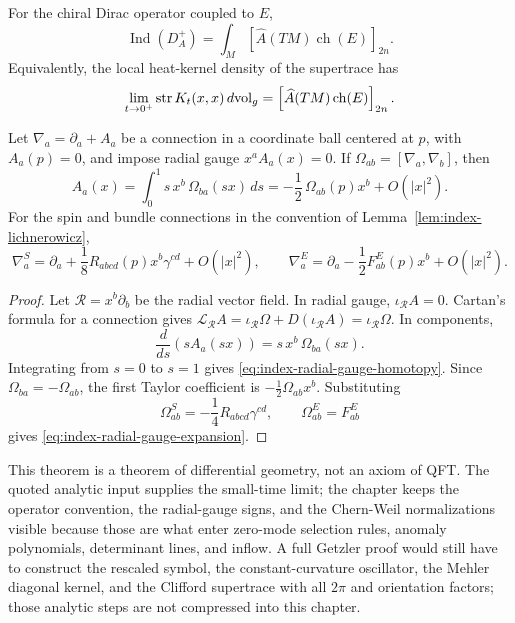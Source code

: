 \begin{quotedtheorem}
\label{thm:index-atiyah-singer-local}
For the chiral Dirac operator coupled to \(E\),
\begin{equation}
  \operatorname{Ind}(D_A^+)
  =
  \int_M
  \left[\widehat A(TM)\operatorname{ch}(E)\right]_{2n}.
  \label{eq:index-atiyah-singer}
\end{equation}
Equivalently, the local heat-kernel density of the supertrace has
\[
  \lim_{t\to0^+}{\rm str}\,K_t(x,x)\,d{\rm vol}_g
  =
  \left[\widehat A(TM)\operatorname{ch}(E)\right]_{2n}.
\]
\end{quotedtheorem}

\begin{lemma}
\label{lem:index-radial-gauge-expansion}
Let \(\nabla_a=\partial_a+A_a\) be a connection in a coordinate ball centered
at \(p\), with \(A_a(p)=0\), and impose radial gauge \(x^aA_a(x)=0\).  If
\(\Omega_{ab}=[\nabla_a,\nabla_b]\), then
\begin{equation}
  A_a(x)
  =
  \int_0^1 s\,x^b\,\Omega_{ba}(sx)\,ds
  =
  -\frac12\,\Omega_{ab}(p)x^b+O(|x|^2).
  \label{eq:index-radial-gauge-homotopy}
\end{equation}
For the spin and bundle connections in the convention of
Lemma~\ref{lem:index-lichnerowicz},
\begin{equation}
  \nabla_a^S
  =
  \partial_a+\frac18R_{ab cd}(p)x^b\gamma^{cd}+O(|x|^2),
  \qquad
  \nabla_a^E
  =
  \partial_a-\frac12F^E_{ab}(p)x^b+O(|x|^2).
  \label{eq:index-radial-gauge-expansion}
\end{equation}
\end{lemma}

\begin{proof}
Let \(\mathcal R=x^b\partial_b\) be the radial vector field.  In radial gauge,
\(\iota_{\mathcal R}A=0\).  Cartan's formula for a connection gives
\(\mathcal L_{\mathcal R}A
=\iota_{\mathcal R}\Omega+D(\iota_{\mathcal R}A)
=\iota_{\mathcal R}\Omega\).  In components,
\[
  \frac{d}{ds}\left(sA_a(sx)\right)
  =
  s\,x^b\,\Omega_{ba}(sx).
\]
Integrating from \(s=0\) to \(s=1\) gives
\eqref{eq:index-radial-gauge-homotopy}.  Since
\(\Omega_{ba}=-\Omega_{ab}\), the first Taylor coefficient is
\(-\frac12\Omega_{ab}x^b\).  Substituting
\[
  \Omega^S_{ab}=-\frac14R_{ab cd}\gamma^{cd},
  \qquad
  \Omega^E_{ab}=F^E_{ab}
\]
gives \eqref{eq:index-radial-gauge-expansion}.
\end{proof}

This theorem is a theorem of differential geometry, not an axiom of QFT.  The
quoted analytic input supplies the small-time limit; the chapter keeps the
operator convention, the radial-gauge signs, and the Chern-Weil normalizations
visible because those are what enter zero-mode selection rules, anomaly
polynomials, determinant lines, and inflow.  A full Getzler proof would still
have to construct the rescaled symbol, the constant-curvature oscillator, the
Mehler diagonal kernel, and the Clifford supertrace with all \(2\pi\) and
orientation factors; those analytic steps are not compressed into this
chapter.

